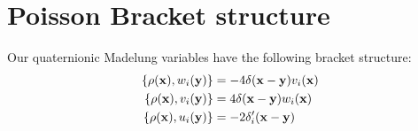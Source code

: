 \documentclass[a4paper,aps,prd,preprint,groupedaddress]{revtex4}
\begin{document}
\section{Poisson Bracket structure\label{sec:app2}}

Our quaternionic Madelung variables have the following bracket structure:
\begin{equation}
\begin{split}
\{\rho({\bf x}), w_i({\bf y})\}&=-4\delta({\bf x}-{\bf y})v_i({\bf x})\\
\{\rho({\bf x}), v_i({\bf y})\}&=4\delta({\bf x}-{\bf y})w_i({\bf x})\\
\{\rho({\bf x}), u_i({\bf y})\}&=-2\delta_i'({\bf x}-{\bf y})\\
\end{split}
\end{equation}
\end{document}
